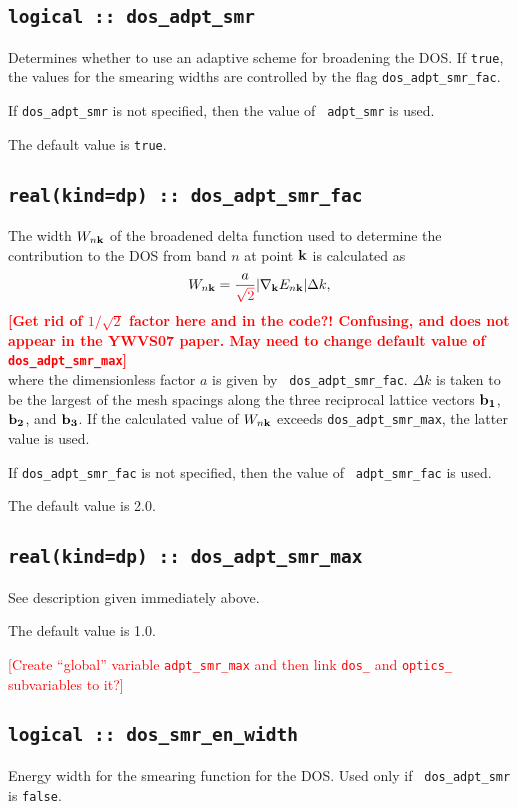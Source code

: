 \subsection[dos\_adpt\_smr]{\tt logical :: dos\_adpt\_smr}
Determines whether to use an adaptive scheme for broadening the
DOS. If \verb#true#, the values for the smearing widths are 
controlled by the flag {\tt dos\_adpt\_smr\_fac}.

If {\tt dos\_adpt\_smr} is not specified, then the value of {\tt
  adpt\_smr} is used.  

The default value is \verb#true#.


\subsection[dos\_adpt\_smr\_fac]{\tt real(kind=dp) :: dos\_adpt\_smr\_fac}

The width $W_{n{\bf k}}$ of the broadened delta function used to
determine the contribution to the DOS from band $n$ at point ${\bf k}$
is calculated as
%
$$
W_{n{\bf k}}=\frac{a}{\textcolor{red}{\sqrt{2}}}\vert
\nabla_{\bf k} E_{n{\bf k}}\vert \Delta k,
$$ 
%
\textcolor{red}{{\bf [Get rid of $1/\sqrt{2}$ factor here and in the code?! 
Confusing, and does not appear in the YWVS07 paper. May need to change default value of
{\tt dos\_adpt\_smr\_max}]}}\\
where the dimensionless factor $a$ is given by {\tt
  dos\_adpt\_smr\_fac}. $\Delta k$ is taken to be the largest of
the mesh spacings along the three reciprocal lattice vectors ${\bf
  b_1}$, ${\bf b_2}$, and ${\bf b_3}$.  If the calculated value of
$W_{n{\bf k}}$ exceeds {\tt dos\_adpt\_smr\_max}, the latter
value is used.

If {\tt dos\_adpt\_smr\_fac} is not specified, then the value of {\tt
  adpt\_smr\_fac} is used.  

The default value is 2.0.


\subsection[dos\_adpt\_smr\_max]{\tt real(kind=dp) ::
  dos\_adpt\_smr\_max}

See description given immediately above.

The default value is 1.0.

\textcolor{red}{[Create ``global'' variable {\tt adpt\_smr\_max} and then link
{\tt dos\_} and {\tt optics\_} subvariables to it?]}

\subsection[dos\_smr\_en\_width]{\tt logical :: dos\_smr\_en\_width}
Energy width for the smearing function for the DOS. Used only if {\tt
  dos\_adpt\_smr} is \verb#false#.

